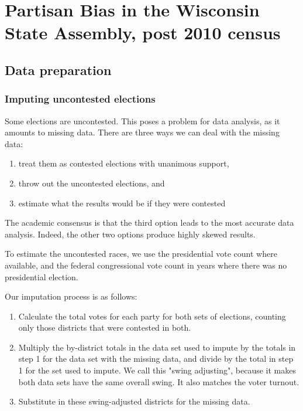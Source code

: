 \documentclass[preprint,12pt]{article}
\begin{document}
\section{Partisan Bias in the Wisconsin State Assembly, post 2010 census\label{sec:Wis}}

\subsection{Data preparation}
\subsubsection{Imputing uncontested elections}
 
Some elections are uncontested.   This poses a problem for data analysis, as it amounts to missing data.  There are three ways we can deal with the missing data: 
 

\begin{enumerate}
\item treat them as contested elections with unanimous support, 
\item throw out the uncontested elections, and 
\item estimate what the results would be if they were contested
\end{enumerate}
 
The academic consensus is that the third option leads to the most accurate data analysis.  Indeed, the other two options produce highly skewed results.
 
To estimate the uncontested races, we use the presidential vote count where available, and the federal congressional vote count in years where there was no presidential election.
 
Our imputation process is as follows:
 
\begin{enumerate}
\item Calculate the total votes for each party for both sets of elections, counting only those districts that were contested in both.
\item Multiply the by-district totals in the data set used to impute by the totals in step 1 for the data set with the missing data, and divide by the total in step 1 for the set used to impute.  We call this "swing adjusting", because it makes both data sets have the same overall swing.  It also matches the voter turnout.
\item Substitute in these swing-adjusted districts for the missing data.
\end{enumerate}
 
\end{document}
